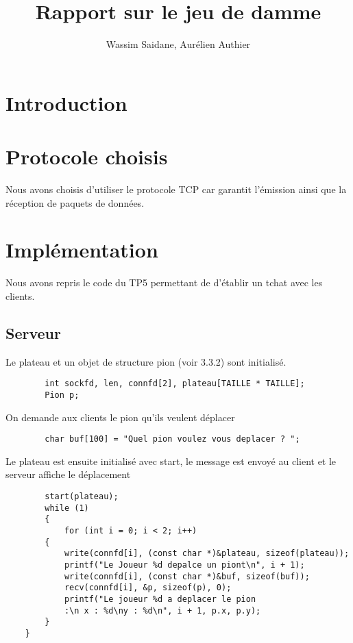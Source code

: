 \documentclass{article}
\title{Rapport sur le jeu de damme}
\author{Wassim Saidane, Aurélien Authier}
\date{}
\begin{document}
    \lstset{language=C}
    \maketitle
    \tableofcontents
    \newpage
    \section{Introduction}

    \section{Protocole choisis}
        Nous avons choisis d'utiliser le protocole TCP car garantit l’émission ainsi que la réception de paquets de données.
    \section{Implémentation}
        Nous avons repris le code du TP5 permettant de d'établir un tchat avec les clients.
    \subsection{Serveur}
    Le plateau et un objet de structure pion (voir 3.3.2) sont initialisé.
    \begin{lstlisting}
        int sockfd, len, connfd[2], plateau[TAILLE * TAILLE];
        Pion p;
    \end{lstlisting}
    On demande aux clients le pion qu'ils veulent déplacer 
    \begin{lstlisting}
        char buf[100] = "Quel pion voulez vous deplacer ? ";
    \end{lstlisting}
    Le plateau est ensuite initialisé avec start, le message est envoyé au client et le serveur affiche le déplacement
    \begin{lstlisting}
        start(plateau);
        while (1)
        {
            for (int i = 0; i < 2; i++)
        {
            write(connfd[i], (const char *)&plateau, sizeof(plateau));
            printf("Le Joueur %d depalce un piont\n", i + 1);
            write(connfd[i], (const char *)&buf, sizeof(buf));
            recv(connfd[i], &p, sizeof(p), 0);
            printf("Le joueur %d a deplacer le pion 
            :\n x : %d\ny : %d\n", i + 1, p.x, p.y);
        }
    }
    \end{lstlisting}

    
\end{document}
